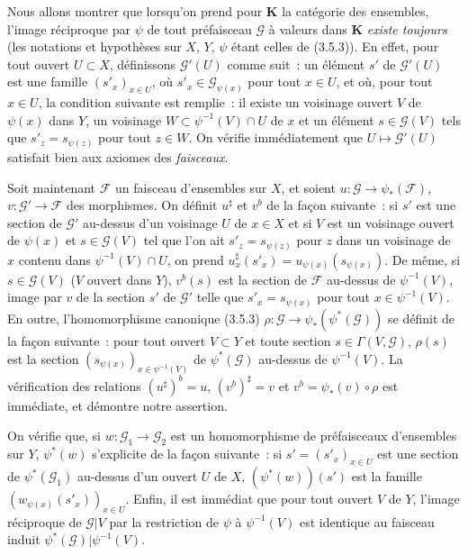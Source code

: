 
\begin{env}[3.7.1]
\label{0.3.7.1-fr}
Nous allons montrer que lorsqu'on prend pour $\mathbf{K}$ la catégorie des
ensembles, l'image réciproque par $\psi$ de tout préfaisceau $\mathcal{G}$ à
valeurs dans $\mathbf{K}$ \emph{existe toujours} (les notations et hypothèses
sur $X$, $Y$, $\psi$ étant celles de (3.5.3)). En effet, pour tout ouvert
$U\subset X$, définissons $\mathcal{G}'(U)$ comme suit~: un élément $s'$ de
$\mathcal{G}'(U)$ est une famille $(s'_x)_{x\in U}$, où
$s'_x\in\mathcal{G}_{\psi(x)}$ pour tout $x\in U$, et où, pour tout $x\in U$,
la condition suivante est remplie~: il existe un voisinage ouvert $V$ de
$\psi(x)$ dans $Y$, un voisinage $W\subset\psi^{-1}(V)\cap U$ de $x$ et un
élément $s\in\mathcal{G}(V)$ tels que $s'_z=s_{\psi(z)}$ pour tout $z\in W$.
On vérifie immédiatement que $U\mapsto\mathcal{G}'(U)$ satisfait bien aux axiomes
des \emph{faisceaux}.

Soit maintenant $\mathcal{F}$ un faisceau d'ensembles sur $X$, et soient
$u:\mathcal{G}\to\psi_*(\mathcal{F})$,
$v:\mathcal{G}'\to\mathcal{F}$ des morphismes. On définit $u^\sharp$ et $v^b$
de la façon suivante~: si $s'$ est une section de $\mathcal{G}'$ au-dessus
d'un voisinage $U$ de $x\in X$ et si $V$ est un voisinage ouvert de $\psi(x)$
et $s\in\mathcal{G}(V)$ tel que l'on ait $s'_z=s_{\psi(z)}$ pour $z$ dans un
voisinage de $x$ contenu dans $\psi^{-1}(V)\cap U$, on prend
$u_x^\sharp(s'_x)=u_{\psi(x)}(s_{\psi(x)})$. De même, si
$s\in\mathcal{G}(V)$ ($V$ ouvert dans $Y$), $v^b(s)$ est la section de
$\mathcal{F}$ au-dessus de $\psi^{-1}(V)$, image par $v$ de la section $s'$ de
$\mathcal{G}'$ telle que $s'_x=s_{\psi(x)}$ pour tout
$x\in\psi^{-1}(V)$. En outre, l'homomorphisme canonique (3.5.3)
$\rho:\mathcal{G}\to\psi_*(\psi^*(\mathcal{G}))$ se définit de la façon
suivante~: pour tout ouvert $V\subset Y$ et toute section
$s\in\Gamma(V,\mathcal{G})$, $\rho(s)$ est la section
$(s_{\psi(x)})_{x\in\psi^{-1}(V)}$ de $\psi^*(\mathcal{G})$ au-dessus de
$\psi^{-1}(V)$. La vérification des relations
$(u^\sharp)^b=u$, $(v^b)^\sharp=v$ et
$v^b=\psi_*(v)\circ\rho$ est immédiate, et démontre notre assertion.

On vérifie que, si $w:\mathcal{G}_1\to\mathcal{G}_2$ est un homomorphisme de
préfaisceaux d'ensembles sur $Y$, $\psi^*(w)$ s'explicite de la façon
suivante~: si $s'=(s'_x)_{x\in U}$ est une section de
$\psi^*(\mathcal{G}_1)$ au-dessus d'un ouvert $U$ de $X$,
$(\psi^*(w))(s')$ est la famille
$(w_{\psi(x)}(s'_x))_{x\in U}$. Enfin, il est immédiat que pour tout ouvert
$V$ de $Y$, l'image réciproque de $\mathcal{G}|V$ par la restriction de
$\psi$ à $\psi^{-1}(V)$ est identique au faisceau induit
$\psi^*(\mathcal{G})|\psi^{-1}(V)$.


\end{env}

